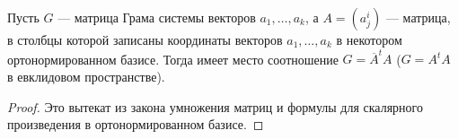 \begin{proposal}
    Пусть $G$ --- матрица Грама системы векторов $a_1, \ldots, a_k$, а $A = (a^i_j)$ --- матрица, в столбцы которой записаны координаты векторов $a_1, \ldots, a_k$ в некотором ортонормированном базисе. Тогда имеет место соотношение
    $G = \overline{A}^tA$ ($G = A^tA$ в евклидовом пространстве).
\end{proposal}

\begin{proof}
    Это вытекат из закона умножения матриц и формулы для скалярного произведения в ортонормированном базисе.
\end{proof}

